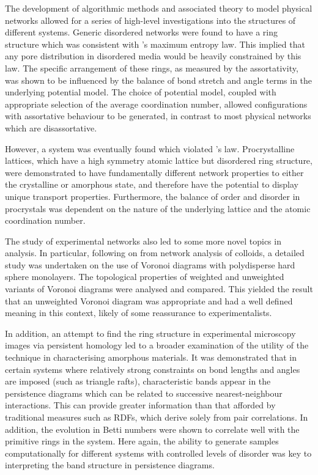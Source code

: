 The development of algorithmic methods and associated theory to model physical networks allowed for a series of high\--level investigations into the structures of different systems.
Generic disordered networks were found to have a ring structure which was consistent with \lm's maximum entropy law.
This implied that any pore distribution in disordered media would be heavily constrained by this law.
The specific arrangement of these rings, as measured by the assortativity, was shown to be influenced by the balance of bond stretch and angle terms in the underlying potential model.
The choice of potential model, coupled with appropriate selection of the average coordination number, allowed configurations with assortative behaviour to be generated, in contrast to most physical networks which are disassortative.  

However, a system was eventually found which violated \lm's law.
Procrystalline lattices, which have a high symmetry atomic lattice but disordered ring structure, were demonstrated to have fundamentally different network properties to either the crystalline or amorphous state, and therefore have the potential to display unique transport properties.
Furthermore, the balance of order and disorder in procrystals was dependent on the nature of the underlying lattice and the atomic coordination number.

The study of experimental \td{} networks also led to some more novel topics in analysis.
In particular, following on from network analysis of colloids, a detailed study was undertaken on the use of Voronoi diagrams with polydisperse hard sphere monolayers.
The topological properties of weighted and unweighted variants of Voronoi diagrams were analysed and compared.
This yielded the result that an unweighted Voronoi diagram was appropriate and had a well defined meaning in this context, likely of some reassurance to experimentalists.

In addition, an attempt to find the ring structure in experimental microscopy images via persistent homology led to a broader examination of the utility of the technique in characterising amorphous materials.
It was demonstrated that in certain \td{} systems where relatively strong constraints on bond lengths and angles are imposed (such as triangle rafts), characteristic bands appear in the persistence diagrams which can be related to successive nearest\--neighbour interactions.
This can provide greater information than that afforded by traditional measures such as RDFs, which derive solely from pair correlations. 
In addition, the evolution in Betti numbers were shown to correlate well with the primitive rings in the system.
Here again, the ability to generate samples computationally for different systems with controlled levels of disorder was key to interpreting the band structure in persistence diagrams.

